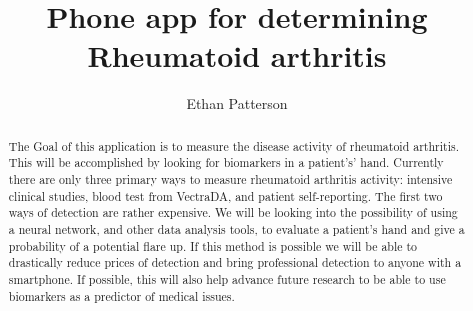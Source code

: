 \documentclass[10pt,journal,draftclsnofoot,onecolumn]{IEEEtran}
\begin{document}
\title{\LARGE Phone app for determining Rheumatoid arthritis}

\author[1]{Ethan Patterson}

\maketitle

\begin{abstract}
The Goal of this application is to measure the disease activity of rheumatoid arthritis. This will be accomplished by looking for biomarkers in a patient's’ hand. Currently there are only three primary ways to measure rheumatoid arthritis activity: intensive clinical studies, blood test from VectraDA, and patient self-reporting. The first two ways of detection are rather expensive. We will be looking into the possibility of using a neural network, and other data analysis tools, to evaluate a patient’s hand and give a probability of a potential flare up. If this method is possible we will be able to drastically reduce prices of detection and bring professional detection to anyone with a smartphone. If possible, this will also help advance future research to be able to use biomarkers as a predictor of medical issues.
\end{abstract}
\end{document}

